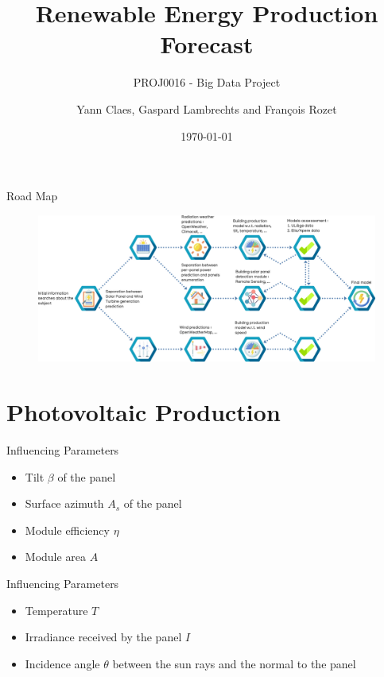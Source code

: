 \documentclass[12pt]{beamer}
\title{Renewable Energy Production Forecast}
\subtitle{PROJ0016 - Big Data Project}
\author{Yann Claes, Gaspard Lambrechts and François Rozet}
\institute{University of Liège}
\date{\today}
\begin{document}
\maketitle

\begin{frame}{Road Map}
    \begin{figure}
        \centering
        \includegraphics[width=\textwidth]{resources/png/roadmap.png}
    \end{figure}
\end{frame}

\section{Photovoltaic Production}

\begin{frame}{Influencing Parameters}
    \begin{itemize}
        \item \alert{Tilt} $\beta$ of the panel
        \item \alert{Surface azimuth} $A_s$ of the panel
        \item Module \alert{efficiency} $\eta$
        \item Module \alert{area} $A$
    \end{itemize}
\end{frame}

\begin{frame}{Influencing Parameters}
    \begin{itemize}
        \item \alert{Temperature} $T$
        \item \alert{Irradiance} received by the panel $I$
        \item \alert{Incidence angle} $\theta$ between the sun rays and the normal to the panel
    \end{itemize}
\end{frame}
\end{document}
